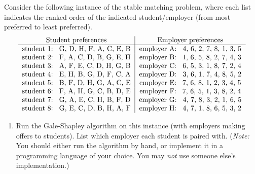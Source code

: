 \documentclass[11pt]{article}
\newcounter{totalpoints}
\newcommand{\points}[1]{\addtocounter{totalpoints}{#1}{[#1 point\ifthenelse{\equal{#1}{1}}{}{s}]}}
\begin{document}
\begin{enumerate}[leftmargin=*,start=0]
Consider the following instance of the stable matching problem, where each list indicates the ranked order of the indicated student/employer (from most preferred to least preferred).
\[
	\begin{tabular}{c|c}
	\mbox{Student preferences} & \mbox{Employer preferences} \\ \hline
\mbox{student 1:} \hspace*{2pt} G, D, H, F, A, C, E, B  & \mbox{employer A:} \hspace*{2pt} 4, 6, 2, 7, 8, 1, 3, 5 \\
%
\mbox{student 2:} \hspace*{2pt} F, A, C, D, B, G, E, H  & \mbox{employer B:} \hspace*{2pt} 1, 6, 5, 8, 2, 7, 4, 3 \\
%
\mbox{student 3:} \hspace*{2pt} A, F, E, C, D, H, G, B  & \mbox{employer C:} \hspace*{2pt} 6, 5, 3, 1, 8, 7, 2, 4 \\
%
\mbox{student 4:} \hspace*{2pt} E, H, B, G, D, F, C, A  & \mbox{employer D:} \hspace*{2pt} 3, 6, 1, 7, 4, 8, 5, 2 \\
%
\mbox{student 5:} \hspace*{2pt} B, F, D, H, G, A, C, E  & \mbox{employer E:} \hspace*{2pt} 7, 6, 8, 1, 2, 3, 4, 5 \\
%
\mbox{student 6:} \hspace*{2pt} F, A, H, G, C, B, D, E  & \mbox{employer F:} \hspace*{2pt} 7, 6, 5, 1, 3, 8, 2, 4 \\
%
\mbox{student 7:} \hspace*{2pt} G, A, E, C, H, B, F, D  & \mbox{employer G:} \hspace*{2pt} 4, 7, 8, 3, 2, 1, 6, 5 \\
%
\mbox{student 8:} \hspace*{2pt} G, E, C, D, B, H, A, F  & \mbox{employer H:} \hspace*{2pt} 4, 7, 1, 8, 6, 5, 3, 2 \\
		\end{tabular}
\]

\begin{enumerate}
\item \points{10} Run the Gale-Shapley algorithm on this instance (with employers making offers to students).
List which employer each student is paired with. (\emph{Note:} You should either run the algorithm by hand, or implement it in a programming language of your choice. You may \emph{not} use someone else's implementation.)


\end{enumerate}
\end{enumerate}
\end{document}

